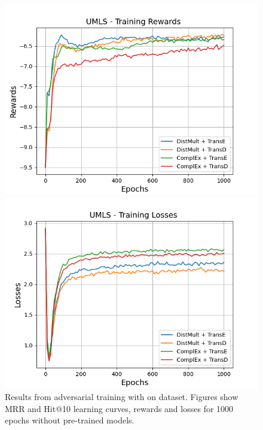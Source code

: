 \begin{figure}
    \begin{minipage}{.5\textwidth}
      \centering
      \includegraphics[width=\linewidth]{figures/results/gan_train/not_pretrained/random/umls/epochs1000/random_umls_rew.png}
    \end{minipage}%
     \begin{minipage}{.5\textwidth}
      \centering
      \includegraphics[width=\linewidth]{figures/results/gan_train/not_pretrained/random/umls/epochs1000/random_umls_losses.png}
    \end{minipage}%
    \caption{Results from adversarial training with \origsampling on \umls dataset.
    Figures show MRR and Hit@10 learning curves, rewards and losses for 1000 epochs without pre-trained models.}
    \label{fig:gan_train_not_pretrained_random_umls}
\end{figure}
